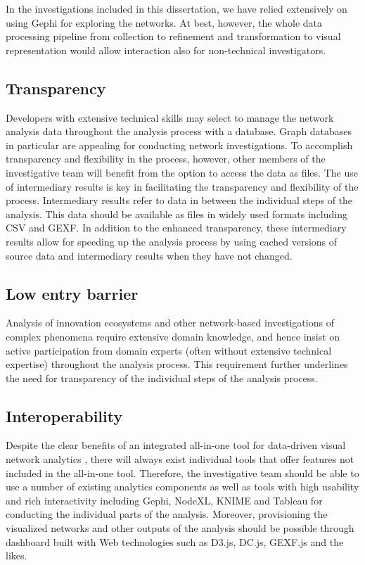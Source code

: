 In the investigations included in this dissertation, we have relied extensively on using Gephi for exploring the networks. At best, however, the whole data processing pipeline from collection to refinement and transformation to visual representation would allow interaction also for non-technical investigators.

\subsection{Transparency}

Developers with extensive technical skills may select to manage the network analysis data throughout the analysis process with a database. Graph databases in particular are appealing for conducting network investigations. To accomplish transparency and flexibility in the process, however, other members of the investigative team will benefit from the option to access the data as files. The use of intermediary results is key in facilitating the transparency and flexibility of the process. Intermediary results refer to data in between the individual steps of the analysis. This data should be available as files in widely used formats including CSV and GEXF. In addition to the enhanced transparency, these intermediary results allow for speeding up the analysis process by using cached versions of source data and intermediary results when they have not changed.

\subsection{Low entry barrier}

Analysis of innovation ecosystems and other network-based investigations of complex phenomena require extensive domain knowledge, and hence insist on active participation from domain experts (often without extensive technical expertise) throughout the analysis process. This requirement further underlines the need for transparency of the individual steps of the analysis process.

\subsection{Interoperability} 

Despite the clear benefits of an integrated all-in-one tool for data-driven visual network analytics \citep[cf.][]{Freeman2000VisualizingNetworks}, there will always exist individual tools that offer features not included in the all-in-one tool. Therefore, the investigative team should be able to use a number of existing analytics components as well as tools with high usability and rich interactivity including Gephi, NodeXL, KNIME and Tableau for conducting the individual parts of the analysis. Moreover, provisioning the visualized networks and other outputs of the analysis should be possible through dashboard built with Web technologies such as D3.js, DC.js, GEXF.js and the likes. 

